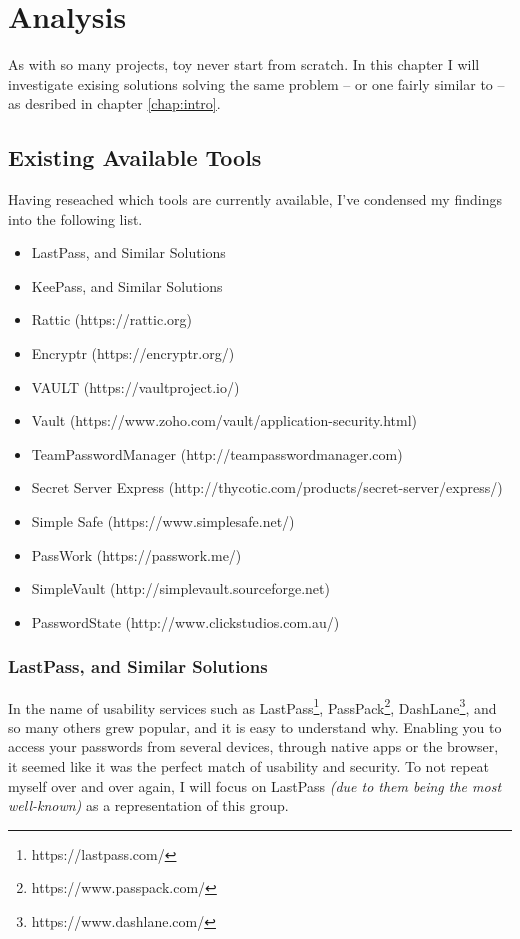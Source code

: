 \chapter{Analysis}
\label{chap:analysis}
	As with so many projects, toy never start from scratch. In this chapter I will investigate exising solutions solving the same problem -- or one fairly similar to -- as desribed in chapter \ref{chap:intro}.

	\section{Existing Available Tools}
		Having reseached which tools are currently available, I've condensed my findings into the following list. 

		\begin{itemize}
			\item LastPass, and Similar Solutions
			\item KeePass, and Similar Solutions
			\item Rattic (https://rattic.org)
			\item Encryptr (https://encryptr.org/)
			\item VAULT (https://vaultproject.io/)
			\item Vault (https://www.zoho.com/vault/application-security.html)
			\item TeamPasswordManager (http://teampasswordmanager.com)
			\item Secret Server Express (http://thycotic.com/products/secret-server/express/)
			\item Simple Safe (https://www.simplesafe.net/)
			\item PassWork (https://passwork.me/)
			\item SimpleVault (http://simplevault.sourceforge.net)
			\item PasswordState (http://www.clickstudios.com.au/)
		\end{itemize}

		\subsection{LastPass, and Similar Solutions}
		\label{subsec:lastpass}
			In the name of usability services such as LastPass\footnote{https://lastpass.com/}, PassPack\footnote{https://www.passpack.com/}, DashLane\footnote{https://www.dashlane.com/}, and so many others grew popular, and it is easy to understand why. Enabling you to access your passwords from several devices, through native apps or the browser, it seemed like it was the perfect match of usability and security. To not repeat myself over and over again, I will focus on LastPass \emph{(due to them being the most well-known)} as a representation of this group.

